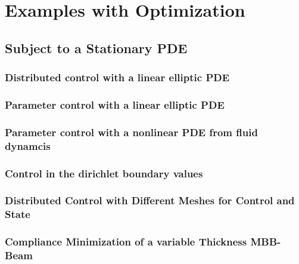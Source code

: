\documentclass[a4paper,cleardoubleempty]{scrreprt}
\theoremstyle{plain}
\theoremstyle{remark}
\begin{document}
\chapter{Examples with Optimization}
\label{OPT}
\section{Subject to a Stationary PDE}
\label{OPT_Stat}
\subsection{Distributed control with a linear elliptic PDE}
\label{OPT_Stat_Distrib_Lin_Ellipt}

\clearpage
\subsection{Parameter control with a linear elliptic PDE}
\label{OPT_Stat_Param_Lin_Ellipt}

\clearpage
\subsection{Parameter control with a nonlinear PDE from fluid dynamcis}
\label{OPT_Stat_Param_Nonlin_Fluid}

\clearpage
\subsection{Control in the dirichlet boundary values}
\label{OPT_Stat_Dirichlet_Boundary}

\clearpage
\subsection{Distributed Control with Different Meshes for Control and State}
\label{OPT_Stat_Distributed_MultiMesh}

\clearpage
\subsection{Compliance Minimization of a variable Thickness MBB-Beam}
\label{OPT_Stat_MBB-Beam}

\clearpage
\end{document}
